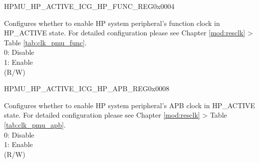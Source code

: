 \begin{register}{H}{PMU\_HP\_ACTIVE\_ICG\_HP\_FUNC\_REG}{0x0004}\label{regdesc:PMUHPACTIVEICGHPFUNCREG}
%
\regnewline%
\begin{regdesc}\begin{reglist}
\label{fielddesc:PMUHPACTIVEDIGICGFUNCEN}\item [PMU\_HP\_ACTIVE\_DIG\_ICG\_FUNC\_EN] Configures whether to enable HP system peripheral's function clock in HP\_ACTIVE state. For detailed configuration please see Chapter \ref{mod:resclk} \textit{} > Table \ref{tab:clk_pmu_func}.\\
0: Disable\\
1: Enable\\
(R/W)
\end{reglist}\end{regdesc}
\end{register}


\begin{register}{H}{PMU\_HP\_ACTIVE\_ICG\_HP\_APB\_REG}{0x0008}\label{regdesc:PMUHPACTIVEICGHPAPBREG}
%
\regnewline%
\begin{regdesc}\begin{reglist}
\label{fielddesc:PMUHPACTIVEDIGICGAPBEN}\item [PMU\_HP\_ACTIVE\_DIG\_ICG\_APB\_EN] Configures whether to enable HP system peripheral's APB clock in HP\_ACTIVE state. For detailed configuration please see Chapter \ref{mod:resclk} \textit{} > Table \ref{tab:clk_pmu_apb}.\\
0: Disable\\
1: Enable\\
(R/W)
\end{reglist}\end{regdesc}
\end{register}


